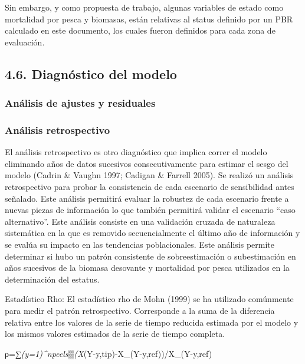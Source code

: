 \documentclass[
]{article}
\begin{document}
Sin embargo, y como propuesta de trabajo, algunas variables de estado
como mortalidad por pesca y biomasas, están relativas al status definido
por un PBR calculado en este documento, los cuales fueron definidos para
cada zona de evaluación.

\hypertarget{diagnuxf3stico-del-modelo}{%
\subsection{4.6. Diagnóstico del
modelo}\label{diagnuxf3stico-del-modelo}}

\hypertarget{anuxe1lisis-de-ajustes-y-residuales}{%
\subsubsection{Análisis de ajustes y
residuales}\label{anuxe1lisis-de-ajustes-y-residuales}}

\hypertarget{anuxe1lisis-retrospectivo}{%
\subsubsection{Análisis retrospectivo}\label{anuxe1lisis-retrospectivo}}

El análisis retrospectivo es otro diagnóstico que implica correr el
modelo eliminando años de datos sucesivos consecutivamente para estimar
el sesgo del modelo (Cadrin \& Vaughn 1997; Cadigan \& Farrell 2005). Se
realizó un análisis retrospectivo para probar la consistencia de cada
escenario de sensibilidad antes señalado. Este análisis permitirá
evaluar la robustez de cada escenario frente a nuevas piezas de
información lo que también permitirá validar el escenario ``caso
alternativo''. Este análisis consiste en una validación cruzada de
naturaleza sistemática en la que es removido secuencialmente el último
año de información y se evalúa su impacto en las tendencias
poblacionales. Este análisis permite determinar si hubo un patrón
consistente de sobreestimación o subestimación en años sucesivos de la
biomasa desovante y mortalidad por pesca utilizados en la determinación
del estatus.

Estadístico Rho: El estadístico rho de Mohn (1999) se ha utilizado
comúnmente para medir el patrón retrospectivo. Corresponde a la suma de
la diferencia relativa entre los valores de la serie de tiempo reducida
estimada por el modelo y los mismos valores estimados de la serie de
tiempo completa.

ρ=∑\emph{(y=1)\^{}npeels▒(X}(Y-y,tip)-X\_(Y-y,ref))/X\_(Y-y,ref)
\end{document}
